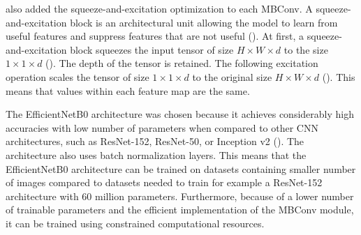\documentclass{BachelorBUI}
\begin{document}
    \begin{table}[!h]
        \centering
        \caption{\centering EfficientNetB0 architecture (Adapted from: \cite{Tan:2019})}
        \label{fig:efficientb0-architecture}
    \end{table}

    \textcite{Tan:2019} also added the squeeze-and-excitation optimization to each MBConv. A squeeze-and-excitation block is an architectural unit allowing the model to learn from useful features and suppress features that are not useful (\cite{Hu:2019}). At first, a squeeze-and-excitation block squeezes the input tensor of size $H \times W \times d$ to the size $1 \times 1 \times d$ (\cite{Hu:2019}). The depth of the tensor is retained. The following excitation operation scales the tensor of size $1 \times 1 \times d$ to the original size $H \times W \times d$ (\cite{Hu:2019}). This means that values within each feature map are the same.

    The EfficientNetB0 architecture was chosen because it achieves considerably high accuracies with low number of parameters when compared to other CNN architectures, such as ResNet-152, ResNet-50, or Inception v2 (\cite{Tan:2019}). The architecture also uses batch normalization layers. This means that the EfficientNetB0 architecture can be trained on datasets containing smaller number of images compared to datasets needed to train for example a ResNet-152 architecture with 60 million parameters. Furthermore, because of a lower number of trainable parameters and the efficient implementation of the MBConv module, it can be trained using constrained computational resources.
\end{document}
